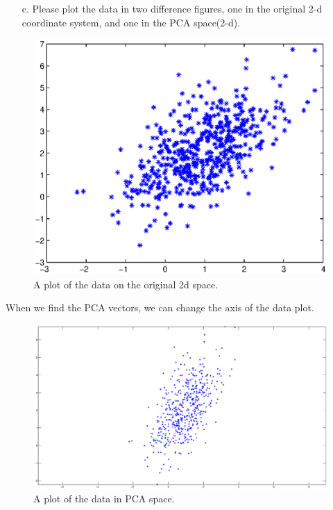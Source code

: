 \documentclass[12pt,letterpaper]{article}
\begin{document}
\begin{enumerate}
\begin{enumerate}
\begin{verbatim}
				 [x1, x2] = eig(V)
					  x1 =
					     = -0.8849    0.4657
						0.4657    0.8849
					  x2 =
					        0.5027         0
					        0    	  2.4730
				\end{verbatim} 
		\item[c.] Please plot the data in two difference figures, one in the original 2-d coordinate system, and one in the PCA space(2-d). \\
	\pagebreak
	\end{enumerate}
	\begin{figure} 
	\includegraphics[width=6in]{original_2d.eps} 
	\caption{A plot of the data on the original 2d space.} 
	\end{figure}
	When we find the PCA vectors, we can change the axis of the data plot. \\
	\begin{figure} 
	\includegraphics[width=6in]{pca_space.eps} 
	\caption{A plot of the data in PCA space.} 
	\end{figure}
	\end{enumerate}
\end{document}

